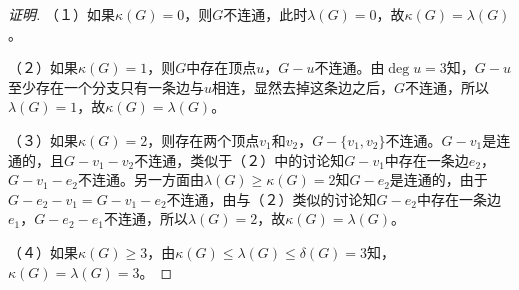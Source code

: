 \begin{proof}[证明]
    （１）如果$\kappa(G)=0$，则$G$不连通，此时$\lambda(G)=0$，故$\kappa(G) = \lambda(G)$。

  （２）如果$\kappa(G)=1$，则$G$中存在顶点$u$，$G-u$不连通。由$\deg u=3$知，$G-u$至少存在一个分支只有一条边与$u$相连，显然去掉这条边之后，$G$不连通，所以$\lambda(G)=1$，故$\kappa(G)=\lambda(G)$。

  （３）如果$\kappa(G)=2$，则存在两个顶点$v_1$和$v_2$，$G-\{v_1,v_2\}$不连通。$G-v_1$是连通的，且$G-v_1-v_2$不连通，类似于（２）中的讨论知$G-v_1$中存在一条边$e_2$，$G-v_1-e_2$不连通。另一方面由$\lambda(G)\geq \kappa(G)=2$知$G-e_2$是连通的，由于$G-e_2-v_1=G-v_1-e_2$不连通，由与（２）类似的讨论知$G-e_2$中存在一条边$e_1$，$G-e_2-e_1$不连通，所以$\lambda(G)=2$，故$\kappa(G)=\lambda(G)$。

  （４）如果$\kappa(G)\geq 3$，由$\kappa(G) \leq \lambda(G) \leq \delta(G) = 3$知，$\kappa(G)=\lambda(G)=3$。
\end{proof}
